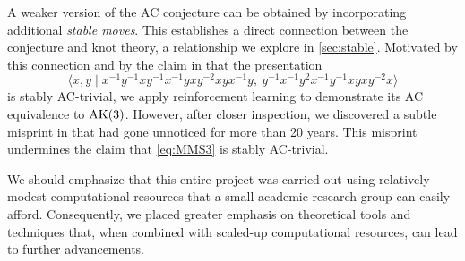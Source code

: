 \medskip
A weaker version of the AC conjecture can be obtained by incorporating additional \textit{stable moves}. This establishes a direct connection between the conjecture and knot theory, a relationship we explore in \cref{sec:stable}. Motivated by this connection and by the claim in \cite{MMS} that the presentation
\begin{equation}\label{eq:MMS3}
	\langle x, y \mid
	x^{-1}y^{-1}xy^{-1}x^{-1}yxy^{-2}xyx^{-1}y, \
	y^{-1}x^{-1}y^2x^{-1}y^{-1}xyxy^{-2}x \rangle
\end{equation}
is stably AC-trivial, we apply reinforcement learning to demonstrate its AC equivalence to $\text{AK}(3)$.
However, after closer inspection, we discovered a subtle misprint in \cite[p.10]{MMS} that had gone unnoticed for more than 20 years. This misprint undermines the claim that \eqref{eq:MMS3} is stably AC-trivial.

\medskip
We should emphasize that this entire project was carried out using relatively modest computational resources that a small academic research group can easily afford. Consequently, we placed greater emphasis on theoretical tools and techniques that, when combined with scaled-up computational resources, can lead to further advancements.




